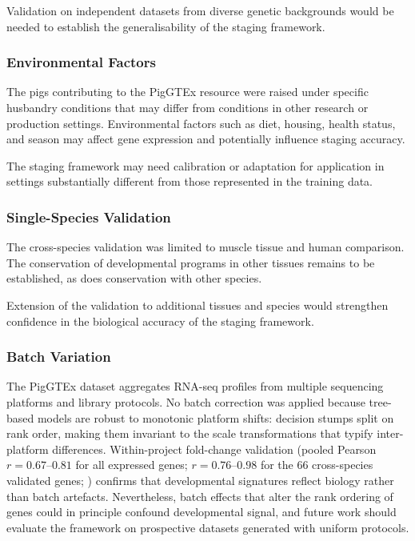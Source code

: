 Validation on independent datasets from diverse genetic backgrounds would be needed to establish the generalisability of the staging framework.

\subsubsection{Environmental Factors}

The pigs contributing to the PigGTEx resource were raised under specific husbandry conditions that may differ from conditions in other research or production settings. Environmental factors such as diet, housing, health status, and season may affect gene expression and potentially influence staging accuracy.

The staging framework may need calibration or adaptation for application in settings substantially different from those represented in the training data.

\subsubsection{Single-Species Validation}

The cross-species validation was limited to muscle tissue and human comparison. The conservation of developmental programs in other tissues remains to be established, as does conservation with other species.

Extension of the validation to additional tissues and species would strengthen confidence in the biological accuracy of the staging framework.

\subsubsection{Batch Variation}

The PigGTEx dataset aggregates RNA-seq profiles from multiple sequencing platforms and library protocols. No batch correction was applied because tree-based models are robust to monotonic platform shifts: decision stumps split on rank order, making them invariant to the scale transformations that typify inter-platform differences. Within-project fold-change validation (pooled Pearson $r = 0.67$--$0.81$ for all expressed genes; $r = 0.76$--$0.98$ for the 66 cross-species validated genes; ) confirms that developmental signatures reflect biology rather than batch artefacts. Nevertheless, batch effects that alter the rank ordering of genes could in principle confound developmental signal, and future work should evaluate the framework on prospective datasets generated with uniform protocols.

